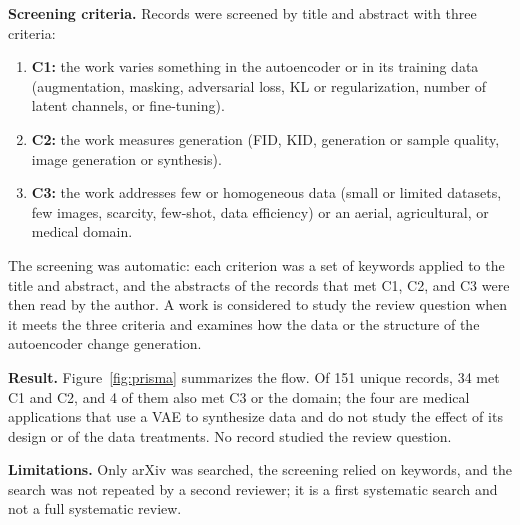 \textbf{Screening criteria.} Records were screened by title and abstract with three criteria:
\begin{enumerate}
  \item \textbf{C1:} the work varies something in the autoencoder or in its training data (augmentation, masking, adversarial loss, KL or regularization, number of latent channels, or fine-tuning).
  \item \textbf{C2:} the work measures generation (FID, KID, generation or sample quality, image generation or synthesis).
  \item \textbf{C3:} the work addresses few or homogeneous data (small or limited datasets, few images, scarcity, few-shot, data efficiency) or an aerial, agricultural, or medical domain.
\end{enumerate}
The screening was automatic: each criterion was a set of keywords applied to the title and abstract, and the abstracts of the records that met C1, C2, and C3 were then read by the author. A work is considered to study the review question when it meets the three criteria and examines how the data or the structure of the autoencoder change generation.

\textbf{Result.} Figure~\ref{fig:prisma} summarizes the flow. Of 151 unique records, 34 met C1 and C2, and 4 of them also met C3 or the domain; the four are medical applications that use a VAE to synthesize data and do not study the effect of its design or of the data treatments. No record studied the review question.

\textbf{Limitations.} Only arXiv was searched, the screening relied on keywords, and the search was not repeated by a second reviewer; it is a first systematic search and not a full systematic review.

